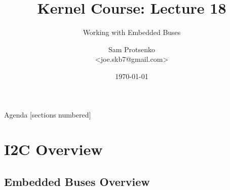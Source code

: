 

\title{Kernel Course: Lecture 18}
\subtitle{Working with Embedded Buses}
\author{Sam Protsenko \texorpdfstring{\\ <joe.skb7@gmail.com>}{}}
\date{\vspace*{5mm}\today}




\maketitle

\begin{frame}{Agenda}
  [sections numbered]
  \tableofcontents[hideallsubsections]
\end{frame}


\section{I2C Overview}

\subsection{Embedded Buses Overview}

